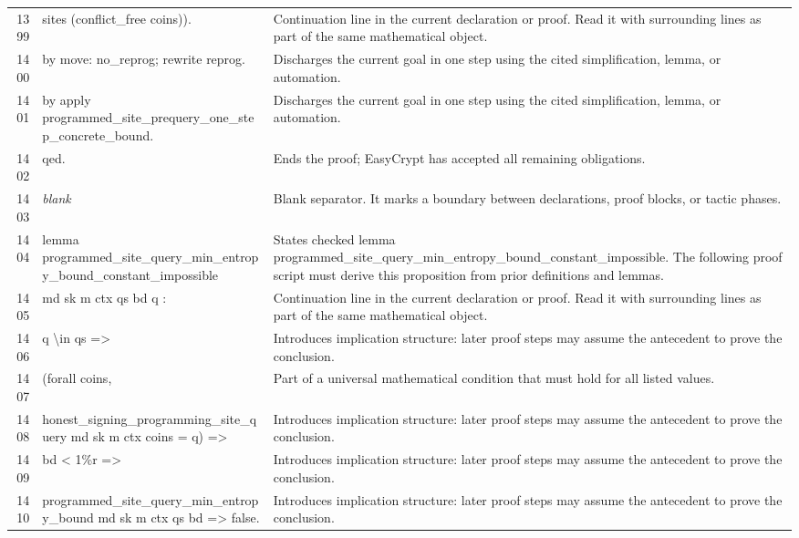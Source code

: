\documentclass[10pt]{article}
\begin{document}
\begin{longtable}{r L{0.53\textwidth} L{0.37\textwidth}}
1399 & {\ttfamily\scriptsize                 sites (conflict\_free coins)).} & Continuation line in the current declaration or proof.  Read it with surrounding lines as part of the same mathematical object. \\
1400 & {\ttfamily\scriptsize   by move: no\_reprog; rewrite reprog.} & Discharges the current goal in one step using the cited simplification, lemma, or automation. \\
1401 & {\ttfamily\scriptsize by apply programmed\_site\_prequery\_one\_step\_concrete\_bound.} & Discharges the current goal in one step using the cited simplification, lemma, or automation. \\
1402 & {\ttfamily\scriptsize qed.} & Ends the proof; EasyCrypt has accepted all remaining obligations. \\
1403 & {\ttfamily\scriptsize \emph{blank}} & Blank separator.  It marks a boundary between declarations, proof blocks, or tactic phases. \\
1404 & {\ttfamily\scriptsize lemma programmed\_site\_query\_min\_entropy\_bound\_constant\_impossible} & States checked lemma programmed\_site\_query\_min\_entropy\_bound\_constant\_impossible.  The following proof script must derive this proposition from prior definitions and lemmas. \\
1405 & {\ttfamily\scriptsize   md sk m ctx qs bd q :} & Continuation line in the current declaration or proof.  Read it with surrounding lines as part of the same mathematical object. \\
1406 & {\ttfamily\scriptsize   q \textbackslash{}in qs =>} & Introduces implication structure: later proof steps may assume the antecedent to prove the conclusion. \\
1407 & {\ttfamily\scriptsize   (forall coins,} & Part of a universal mathematical condition that must hold for all listed values. \\
1408 & {\ttfamily\scriptsize     honest\_signing\_programming\_site\_query md sk m ctx coins = q) =>} & Introduces implication structure: later proof steps may assume the antecedent to prove the conclusion. \\
1409 & {\ttfamily\scriptsize   bd < 1\%r =>} & Introduces implication structure: later proof steps may assume the antecedent to prove the conclusion. \\
1410 & {\ttfamily\scriptsize   programmed\_site\_query\_min\_entropy\_bound md sk m ctx qs bd => false.} & Introduces implication structure: later proof steps may assume the antecedent to prove the conclusion. \\

\end{longtable}
\end{document}
